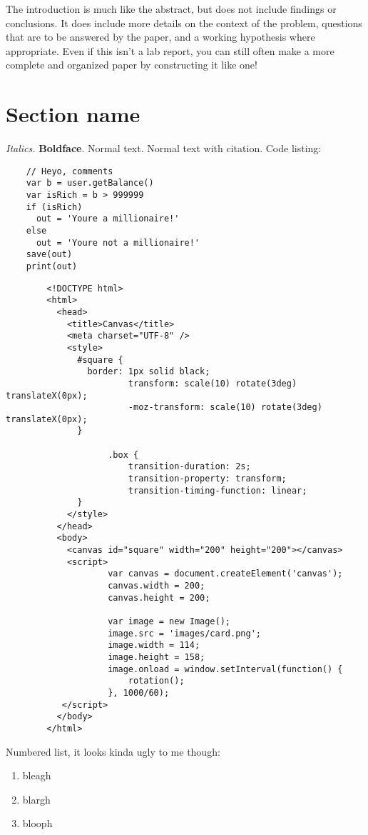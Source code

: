 \documentclass[12pt,a4paper]{article}
\begin{document}
	The introduction is much like the abstract, but does not include findings or conclusions. It does include more details on the context of the problem, questions that are to be answered by the paper, and a working hypothesis where appropriate. Even if this isn't a lab report, you can still often make a more complete and organized paper by constructing it like one!
	
	\section{Section name}
	\textit{Italics.} \textbf{Boldface}. Normal text. Normal text with citation\cite{HarryPotter}. Code listing:
	
	\lstset{language=JavaScript}
	\begin{lstlisting}
	// Heyo, comments
	var b = user.getBalance()
	var isRich = b > 999999
	if (isRich)
	  out = 'Youre a millionaire!'
	else
	  out = 'Youre not a millionaire!'
	save(out)
	print(out)
	\end{lstlisting}
	
	\begin{lstlisting}
		<!DOCTYPE html>
		<html>
		  <head>
		    <title>Canvas</title>
		    <meta charset="UTF-8" />
		    <style>
		      #square {
		        border: 1px solid black;
		                transform: scale(10) rotate(3deg) translateX(0px);
		                -moz-transform: scale(10) rotate(3deg) translateX(0px);
		      }
		
		            .box {              
		                transition-duration: 2s;
		                transition-property: transform;
		                transition-timing-function: linear;
		      }
		    </style>
		  </head>
		  <body>
		    <canvas id="square" width="200" height="200"></canvas>
		    <script>
		            var canvas = document.createElement('canvas');
		            canvas.width = 200;
		            canvas.height = 200;
		
		            var image = new Image();
		            image.src = 'images/card.png';
		            image.width = 114;
		            image.height = 158;
		            image.onload = window.setInterval(function() {
		                rotation();
		            }, 1000/60);
		   </script>
		  </body>
		</html>
	\end{lstlisting}
	
	Numbered list, it looks kinda ugly to me though:
	
	\begin{enumerate}
		\item bleagh
		\item blargh
		\item blooph
	\end{enumerate}
	
\end{document}
